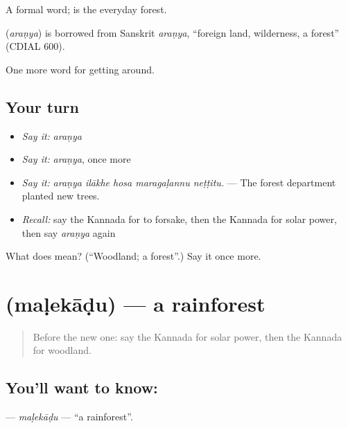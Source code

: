 A formal word;  is the everyday forest.

\begin{cousinweb}
\textbf{} (\emph{araṇya}) is borrowed from Sanskrit \emph{araṇya}, \textquotedblleft{}foreign land, wilderness, a forest\textquotedblright{} (CDIAL 600).
\end{cousinweb}

\begin{grammarlens}[title={What you've built}]
One more word for getting around.
\end{grammarlens}

\subsection*{Your turn}
\begin{itemize}
\raggedright
  \item \emph{Say it:} \emph{araṇya}
  \item \emph{Say it:} \emph{araṇya}, once more
  \item \emph{Say it:} \emph{araṇya ilākhe hosa maragaḷannu neṭṭitu.} — The forest department planted new trees.
  \item \emph{Recall:} say the Kannada for to forsake, then the Kannada for solar power, then say \emph{araṇya} again
\end{itemize}

\begin{tcolorbox}[breakable,colback=teal!4,colframe=teal!35!black,title={Before you move on}]
What does  mean? (\textquotedblleft{}Woodland; a forest\textquotedblright{}.) Say it once more.
\end{tcolorbox}
\section[\texorpdfstring{\kn{ಮಳೆಕಾಡು} (maḷekāḍu)}{ಮಳೆಕಾಡು (maḷekāḍu)}]{ (maḷekāḍu) — a rainforest}

\label{lesson:KA-C475-malekadu}



\begin{quote}
Before the new one: say the Kannada for solar power, then the Kannada for woodland.
\end{quote}

\subsection*{You'll want to know: }
\textbf{} — \emph{maḷekāḍu} — \textquotedblleft{}a rainforest\textquotedblright{}.

